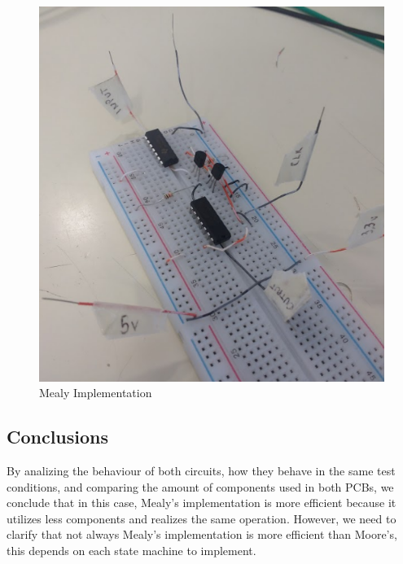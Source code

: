 \begin{figure}[H]
\begin{centering}
\includegraphics[scale=0.5]{../Exercise3/Assignment/images/mealy}
\par\end{centering}
\caption{Mealy Implementation}

\label{3_5}

\end{figure}

\subsection{\color{purple}Conclusions}

By analizing the behaviour of both circuits, how they behave in the
same test conditions, and comparing the amount of components used
in both PCBs, we conclude that in this case, Mealy's implementation
is more efficient because it utilizes less components and realizes
the same operation. However, we need to clarify that not always Mealy's
implementation is more efficient than Moore's, this depends on each
state machine to implement.
%
